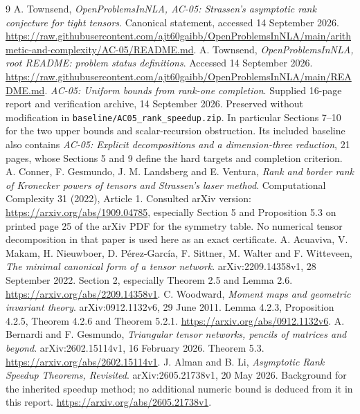 \documentclass[11pt]{article}
\theoremstyle{remark}\newtheorem{remark}[theorem]{Remark}
\begin{document}
\newpage
\begin{thebibliography}{9}
 A. Townsend, \emph{OpenProblemsInNLA, AC-05: Strassen's asymptotic rank conjecture for tight tensors}. Canonical statement, accessed 14 September 2026. \url{https://raw.githubusercontent.com/ajt60gaibb/OpenProblemsInNLA/main/arithmetic-and-complexity/AC-05/README.md}.
 A. Townsend, \emph{OpenProblemsInNLA, root README: problem status definitions}. Accessed 14 September 2026. \url{https://raw.githubusercontent.com/ajt60gaibb/OpenProblemsInNLA/main/README.md}.
 \emph{AC-05: Uniform bounds from rank-one completion}. Supplied 16-page report and verification archive, 14 September 2026. Preserved without modification in \texttt{baseline/AC05\_rank\_speedup.zip}. In particular Sections 7--10 for the two upper bounds and scalar-recursion obstruction. Its included baseline also contains \emph{AC-05: Explicit decompositions and a dimension-three reduction}, 21 pages, whose Sections 5 and 9 define the hard targets and completion criterion.
 A. Conner, F. Gesmundo, J. M. Landsberg and E. Ventura, \emph{Rank and border rank of Kronecker powers of tensors and Strassen's laser method}. Computational Complexity 31 (2022), Article 1. Consulted arXiv version: \url{https://arxiv.org/abs/1909.04785}, especially Section 5 and Proposition 5.3 on printed page 25 of the arXiv PDF for the symmetry table. No numerical tensor decomposition in that paper is used here as an exact certificate.
 A. Acuaviva, V. Makam, H. Nieuwboer, D. P\'erez-Garc\'ia, F. Sittner, M. Walter and F. Witteveen, \emph{The minimal canonical form of a tensor network}. arXiv:2209.14358v1, 28 September 2022. Section 2, especially Theorem 2.5 and Lemma 2.6. \url{https://arxiv.org/abs/2209.14358v1}.
 C. Woodward, \emph{Moment maps and geometric invariant theory}. arXiv:0912.1132v6, 29 June 2011. Lemma 4.2.3, Proposition 4.2.5, Theorem 4.2.6 and Theorem 5.2.1. \url{https://arxiv.org/abs/0912.1132v6}.
 A. Bernardi and F. Gesmundo, \emph{Triangular tensor networks, pencils of matrices and beyond}. arXiv:2602.15114v1, 16 February 2026. Theorem 5.3. \url{https://arxiv.org/abs/2602.15114v1}.
 J. Alman and B. Li, \emph{Asymptotic Rank Speedup Theorems, Revisited}. arXiv:2605.21738v1, 20 May 2026. Background for the inherited speedup method; no additional numeric bound is deduced from it in this report. \url{https://arxiv.org/abs/2605.21738v1}.
\end{thebibliography}
\end{document}
